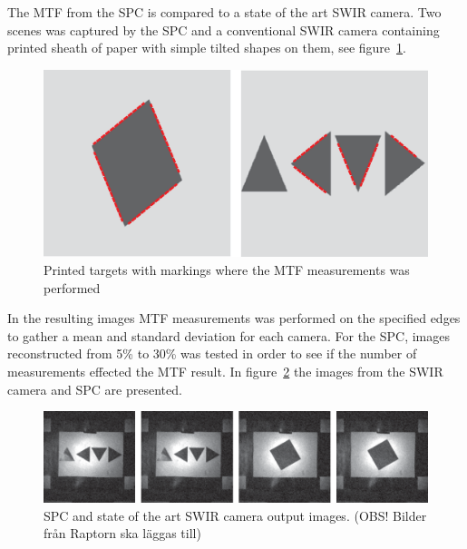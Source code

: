 
The MTF from the SPC is compared to a state of the art SWIR camera. Two scenes was captured by the SPC and a conventional SWIR camera containing printed sheath of paper with simple tilted shapes on them, see figure~\ref{fig:mtf_target}. 



\begin{figure}[H]
    \centering
    \includegraphics[width=0.9\linewidth]{result/mtf/Target.eps}
    \caption{Printed targets with markings where the MTF measurements was performed}
    \label{fig:mtf_target}
\end{figure}

In the resulting images MTF measurements was performed on the specified edges to gather a mean and standard deviation for each camera. For the SPC, images reconstructed from 5\% to 30\% was tested in order to see if the number of measurements effected the MTF result. In figure~\ref{fig:mtf_target_im} the images from the SWIR camera and SPC are presented.

\begin{figure}[H]
    \centering
    \includegraphics[width=1\linewidth]{result/mtf/Target_im.eps}
    \caption{SPC and state of the art SWIR camera output images. (OBS! Bilder från Raptorn ska läggas till)}
    \label{fig:mtf_target_im}
\end{figure}


